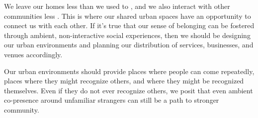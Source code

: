 \documentclass[12pt]{article}
\begin{document}
We leave our homes less than we used to \citep{bls2024}, and we also interact with other communities less \citep{surgeongeneral2023}. This is where our shared urban spaces have an opportunity to connect us with each other. If it's true that our sense of belonging can be fostered through ambient, non-interactive social experiences, then we should be designing our urban environments and planning our distribution of services, businesses, and venues accordingly.

Our urban environments should provide places where people can come repeatedly, places where they might recognize others, and where they might be recognized themselves. Even if they do not ever recognize others, we posit that even ambient co-presence around unfamiliar strangers can still be a path to stronger community.


\pagebreak

\end{document}
